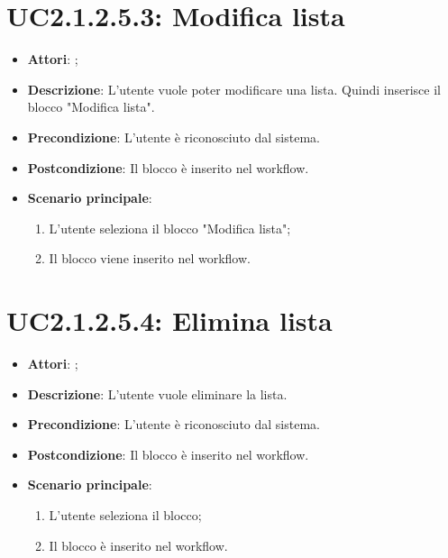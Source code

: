 \section{UC2.1.2.5.3: Modifica lista}
\label{UC2.1.2.5.3}
\begin{itemize}
	\item \textbf{Attori}: ;
	\item \textbf{Descrizione}: L'utente vuole poter modificare una lista. Quindi inserisce il blocco "Modifica lista".
	\item \textbf{Precondizione}: L'utente è riconosciuto dal sistema.
	\item \textbf{Postcondizione}: Il blocco è inserito nel workflow.
	\item \textbf{Scenario principale}:
	\begin{enumerate} \item L'utente seleziona il blocco "Modifica lista";  \item  Il blocco viene inserito nel workflow.\end{enumerate}
\end{itemize}

\section{UC2.1.2.5.4: Elimina lista}
\label{UC2.1.2.5.4}
\begin{itemize}
	\item \textbf{Attori}: ;
	\item \textbf{Descrizione}: L'utente vuole eliminare la lista.
	\item \textbf{Precondizione}: L'utente è riconosciuto dal sistema.
	\item \textbf{Postcondizione}: Il blocco è inserito nel workflow.
	\item \textbf{Scenario principale}:
	\begin{enumerate} \item L'utente seleziona il blocco;  \item  Il blocco è inserito nel workflow.\end{enumerate}
\end{itemize}


